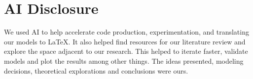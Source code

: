 \documentclass[11pt]{amsart}
\begin{document}
\section{AI Disclosure}

We used AI to help accelerate code production, experimentation, and translating our models to LaTeX. It also helped find resources for our literature review and explore the space adjacent to our research. This helped to iterate faster, validate models and plot the results among other things.  The ideas presented, modeling decisions, theoretical explorations and conclusions were ours. 


\FloatBarrier %
\newpage


\end{document}
